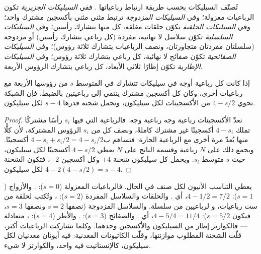 \begin{definition}\label{def:b1:rock-forming-minerals:silicate-classes}
تُصنّف السيليكات بحسب طريقة ارتباط رباعياتها . ففي \emph{السيليكات الجزيرية} تكون الرباعيات معزولة؛ وفي \emph{السيليكات المزدوجة} ترتبط مثنى مثنى بأكسجين مشترك واحد؛ وفي \emph{السيليكات الحلقية} تكوّن حلقات مغلقة، كل منها يتشارك رأسين؛ وفي \emph{السيليكات السلسلية} تكوّن سلاسل لا نهائية، مفردة (كل رباعي يتشارك رأسين) أو مزدوجة (سلسلتان مفردتان متجاورتان، ونصف الرباعيات يتشارك ثلاثة رؤوس)؛ وفي \emph{السيليكات الصفائحية} تكوّن صفائح لا نهائية، كل رباعي يتشارك ثلاثة رؤوس؛ وفي \emph{السيليكات الإطارية} تكوّن إطارًا ثلاثي الأبعاد، كل رباعي يتشارك الرؤوس الأربعة.
\end{definition}

\begin{proposition}\label{prop:b1:rock-forming-minerals:si-o}
إذا كانت كل رباعية أوجه  في سيليكات تتشارك في المتوسط $s$ من رؤوسها الأربعة مع رباعيات أخرى، وكان كل أكسجين مشترك ينتمي إلى رباعيتين بالضبط، فإن الشبكة تحوي $4 - s/2$ من الأكسجينات لكل سيليكون، وتحمل شحنة قدرها $s - 4$ لكل سيليكون.
\end{proposition}

\begin{proof}
نعدّ الأكسجينات رباعية وجه رباعية وجه. فالرباعية التي فيها $s_i$ رأسًا مشتركًا تملك $4 - s_i$ أكسجينًا غير مشترك كاملةً، ونصف كل من $s_i$ الرؤوس المشتركة، لأن كلًّا منها يُعدّ مرة أخرى مع الرباعية الجارة: فتساهم ب$4 - s_i + s_i/2 = 4 - s_i/2$ أكسجينًا. وبجمع ذلك على $N$ رباعية وقسمة الناتج على $N$ يعطي $4 - s/2$ أكسجينًا لكل سيليكون، حيث $s$ متوسط $s_i$. ويحمل كل سيليكون شحنة $+4$ وكل أكسجين $-2$، فتكون الشحنة لكل سيليكون $4 - 2(4 - s/2) = s - 4$.
\end{proof}

يعطي التناسب الأنيون لكل صنف في الحال. فالرباعيات المعزولة ($s = 0$): . والأزواج ($s = 1$): $4 - 1/2 = 7/2$، أي . والحلقات والسلاسل المفردة ($s = 2$): ، وتُكتب  لحلقة من ست رباعيات، و لرباعيين من سلسلة. والسلاسل المزدوجة (نصفها $s = 2$ ونصفها $s = 3$، فيكون $s = 5/2$): $4 - 5/4 = 11/4$، أي . والصفائح ($s = 3$): . والأطر ($s = 4$): ، متعادلة --- فالكوارتز إطار من السيليكون والأكسجين وحدهما. وكلما تشاركت الرباعيات أكثر، قلّت الشحنة المطلوب موازنتها، وقلّت الكاتيونات المعدنية:   فيه أيونان معدنيان لكل سيليكون،  كالإنستاتيت  فيه واحد، والكوارتز لا شيء.

